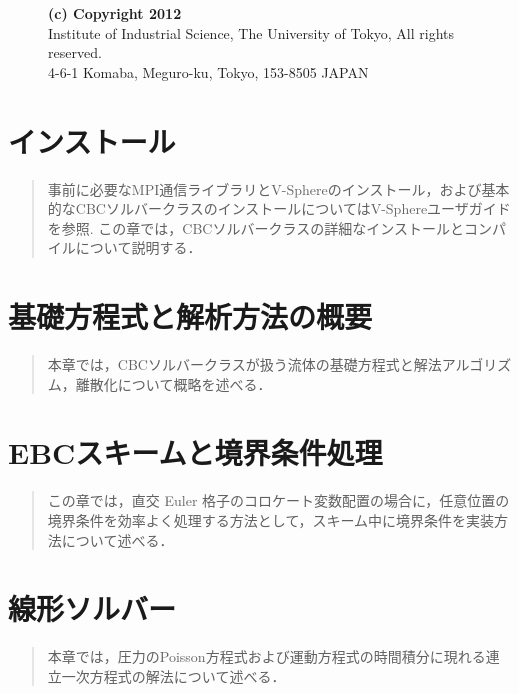 \documentclass[a4paper,10pt,oneside,fleqn]{jsbook}
\begin{document}
\vspace{15cm}

\begin{description}
\item[ ] \textbf{(c) Copyright 2012}\\
Institute of Industrial Science, The University of Tokyo, All rights reserved.\\
4-6-1 Komaba, Meguro-ku, Tokyo, 153-8505 JAPAN\\
\end{description}
%

\tableofcontents
%
%
\mainmatter

%
\chapter{インストール}
\begin{abstract}
事前に必要なMPI通信ライブラリとV-Sphereのインストール，および基本的なCBCソルバークラスのインストールについてはV-Sphereユーザガイドを参照.
この章では，CBCソルバークラスの詳細なインストールとコンパイルについて説明する．
\end{abstract}


%
\chapter{基礎方程式と解析方法の概要}
\begin{abstract}
本章では，CBCソルバークラスが扱う流体の基礎方程式と解法アルゴリズム，離散化について概略を述べる．
\end{abstract}


%
\chapter{EBCスキームと境界条件処理}
\label{chpt:ebcs}
\begin{abstract}
この章では，直交 Euler 格子のコロケート変数配置の場合に，任意位置の境界条件を効率よく処理する方法として，スキーム中に境界条件を実装方法について述べる．
\end{abstract}


%
\chapter{線形ソルバー}
\begin{abstract}
本章では，圧力のPoisson方程式および運動方程式の時間積分に現れる連立一次方程式の解法について述べる．
\end{abstract}

\end{document}
